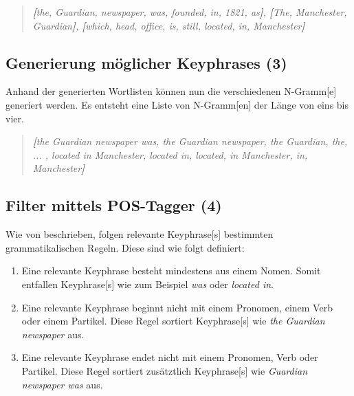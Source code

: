 \begin{quote}
\textit{\textbf{[}the, Guardian, newspaper, was, founded, in, 1821, as\textbf{]}, \textbf{[}The, Manchester, Guardian\textbf{]}, \textbf{[}which, head, office, is, still, located, in, Manchester\textbf{]}}
\end{quote}



\subsection{Generierung möglicher Keyphrases (3)}


Anhand der generierten Wortlisten können nun die verschiedenen \gls{N-Gramm}[e] generiert werden. Es entsteht eine Liste von \gls{N-Gramm}[en] der Länge von eins bis vier.

\begin{quote}
\textit{\textbf{[}the Guardian newspaper was, the Guardian newspaper, the Gu\-ardian, the, ... , located in Manchester, located in, located, in Manchester, in, Manchester\textbf{]}}
\end{quote}



\subsection{Filter mittels POS-Tagger (4)}


Wie von \cite{parameswaran2010towards} beschrieben, folgen relevante \gls{Keyphrase}[s] bestimmten grammatikalischen Regeln. Diese sind wie folgt definiert:
\begin{enumerate}
    \item Eine relevante \gls{Keyphrase} besteht mindestens aus einem Nomen. Somit entfallen \gls{Keyphrase}[s] wie zum Beispiel \textit{was} oder \textit{located in}.
    \item Eine relevante \gls{Keyphrase} beginnt nicht mit einem Pronomen, einem Verb oder einem Partikel. Diese Regel sortiert \gls{Keyphrase}[s] wie \textit{the Guardian newspaper} aus.
    \item Eine relevante \gls{Keyphrase} endet nicht mit einem Pronomen, Verb oder Partikel. Diese Regel sortiert zusätztlich \gls{Keyphrase}[s] wie \textit{Guardian newspaper was} aus.
\end{enumerate}

